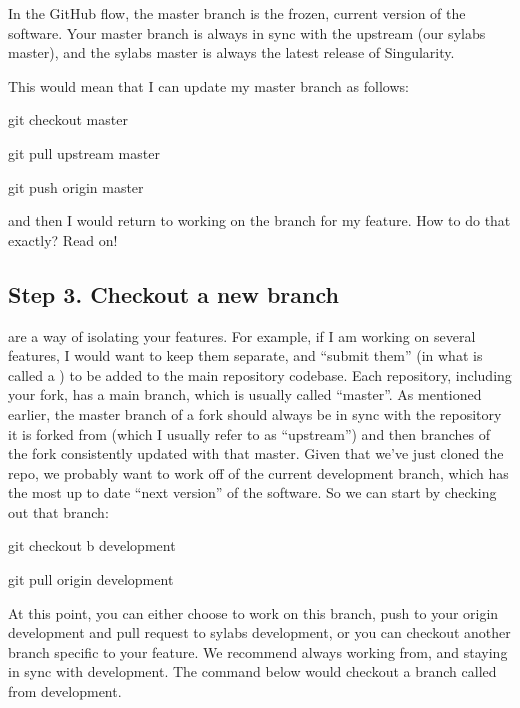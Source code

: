 \documentclass[letterpaper,10pt,english]{sphinxmanual}
\begin{document}
In the GitHub flow, the master branch is the frozen, current version of the software.
Your master branch is always in sync with the upstream (our sylabs master), and the sylabs master is always the latest release of Singularity.

This would mean that I can update my master branch as follows:

%
\begin{sphinxVerbatim}[commandchars=\\\{\}]
git checkout master

git pull upstream master

git push origin master
\end{sphinxVerbatim}

and then I would return to working on the branch for my feature. How to do that exactly? Read on!


\subsection{Step 3. Checkout a new branch}
\label{\detokenize{contributing:step-3-checkout-a-new-branch}}
 are a way of isolating your features. For example, if I am working on several features, I would want to keep them separate, and “submit them” (in what is called a  ) to be added to the main repository codebase. Each repository, including your fork, has a main branch, which is usually called “master”. As mentioned earlier, the master branch of a fork should always be in sync with the repository it is forked from (which I usually refer to as “upstream”) and then branches of the fork consistently updated with that master. Given that we’ve just cloned the repo, we probably want to work off of the current development branch, which has the most up to date “next version” of the software. So we can start by checking out that branch:

%
\begin{sphinxVerbatim}[commandchars=\\\{\}]
git checkout \PYGZhy{}b development

git pull origin development
\end{sphinxVerbatim}

At this point, you can either choose to work on this branch, push to your origin development and pull request to sylabs development, or you can checkout another branch specific to your feature. We recommend always working from, and staying in sync with development. The command below would checkout a branch called  from development.
\end{document}
